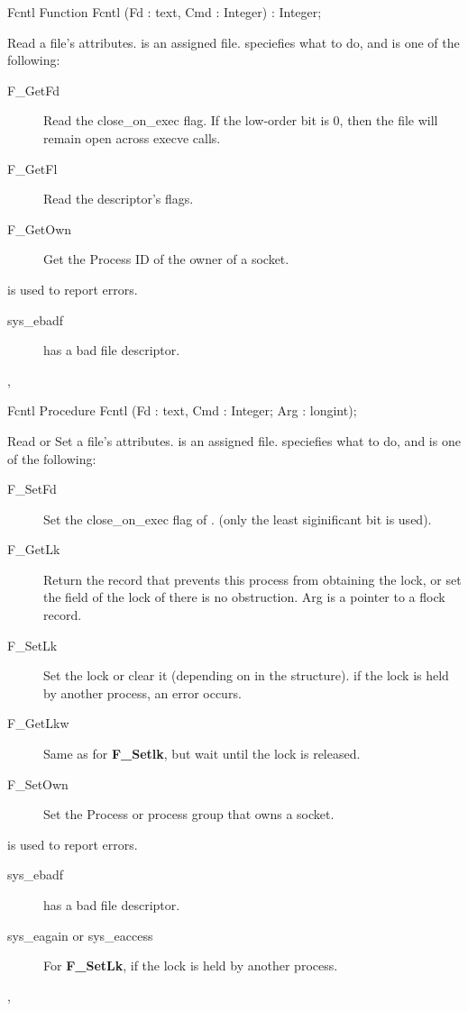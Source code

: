 \html{}
\begin{function}{Fcntl}
\Declaration
Function Fcntl (Fd :  text, Cmd : Integer) : Integer;

\Description

Read a file's attributes.  is an assigned file.
 speciefies what to do, and is one of the following:
\begin{description}
\item[F\_GetFd] Read the close\_on\_exec flag. If the low-order bit is 0, then
the file will remain open across execve calls.
\item[F\_GetFl] Read the descriptor's flags.
\item[F\_GetOwn] Get the Process ID of the owner of a socket.
\end{description}

\Errors

 is used to report errors.
\begin{description}
\item[sys\_ebadf]  has a bad file descriptor.
\end{description}

\SeeAlso
{},  
\end{function}
\begin{procedure}{Fcntl}
\Declaration
Procedure Fcntl (Fd :  text, Cmd : Integer; Arg : longint);

\Description

Read or Set a file's attributes.  is an assigned file.
 speciefies what to do, and is one of the following:
\begin{description}
\item[F\_SetFd] Set the close\_on\_exec flag of . (only the least
siginificant bit is used).
\item[F\_GetLk] Return the  record that prevents this process from
obtaining the lock, or set the  field of the lock of there is no
obstruction. Arg is a pointer to a flock record.
\item[F\_SetLk] Set the lock or clear it (depending on  in the
 structure). if the lock is held by another process, an error
occurs.
\item[F\_GetLkw] Same as for \textbf{F\_Setlk}, but wait until the lock is
released.
\item[F\_SetOwn] Set the Process or process group that owns a socket.
\end{description}

\Errors

 is used to report errors.
\begin{description}
\item[sys\_ebadf]  has a bad file descriptor.
\item[sys\_eagain or sys\_eaccess] For \textbf{F\_SetLk}, if the lock is
held by another process.
\end{description}

\SeeAlso
{},  
\end{procedure}
